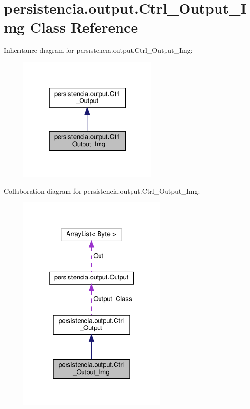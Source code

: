 \hypertarget{classpersistencia_1_1output_1_1Ctrl__Output__Img}{}\section{persistencia.\+output.\+Ctrl\+\_\+\+Output\+\_\+\+Img Class Reference}
\label{classpersistencia_1_1output_1_1Ctrl__Output__Img}


Inheritance diagram for persistencia.\+output.\+Ctrl\+\_\+\+Output\+\_\+\+Img\+:\nopagebreak
\begin{figure}[H]
\begin{center}
\leavevmode
\includegraphics[width=198pt]{classpersistencia_1_1output_1_1Ctrl__Output__Img__inherit__graph}
\end{center}
\end{figure}


Collaboration diagram for persistencia.\+output.\+Ctrl\+\_\+\+Output\+\_\+\+Img\+:\nopagebreak
\begin{figure}[H]
\begin{center}
\leavevmode
\includegraphics[width=211pt]{classpersistencia_1_1output_1_1Ctrl__Output__Img__coll__graph}
\end{center}
\end{figure}
